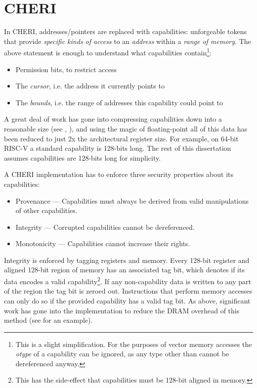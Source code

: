 \section{CHERI}\label{chap:bg:sec:cheri}
In CHERI, addresses/pointers are replaced with capabilities: unforgeable tokens that provide \emph{specific kinds of access} to an \emph{address} within a \emph{range of memory}.
The above statement is enough to understand what capabilities contain\footnote{This is a slight simplification. For the purposes of vector memory accesses the \emph{otype} of a capability can be ignored, as any type other than  cannot be dereferenced anyway.}:
\begin{itemize}
    \item Permission bits, to restrict access
    \item The \emph{cursor}, i.e. the address it currently points to
    \item The \emph{bounds}, i.e. the range of addresses this capability could point to
\end{itemize}
A great deal of work has gone into compressing capabilities down into a reasonable size (see \cite{woodruffCHERIConcentratePractical2019}, ), and using the magic of floating-point all of this data has been reduced to just 2x the architectural register size.
For example, on 64-bit RISC-V a standard capability is 128-bits long.
The rest of this dissertation assumes capabilities are 128-bits long for simplicity.

A CHERI implementation has to enforce three security properties about its capabilities\cite[Section 1.2.1]{TR-951}:
\begin{itemize}
    \item Provenance --- Capabilities must always be derived from valid manipulations of other capabilities.
    \item Integrity --- Corrupted capabilities cannot be dereferenced.
    \item Monotonicity --- Capabilities cannot increase their rights.
\end{itemize}

Integrity is enforced by tagging registers and memory.
Every 128-bit register and aligned 128-bit region of memory has an associated tag bit, which denotes if its data encodes a valid capability\footnote{This has the side-effect that capabilities must be 128-bit aligned in memory.}.
If any non-capability data is written to any part of the region the tag bit is zeroed out.
Instructions that perform memory accesses can only do so if the provided capability has a valid tag bit.
As above, significant work has gone into the implementation to reduce the DRAM overhead of this method (see \cite{joannouEfficientTaggedMemory2017} for an example).

